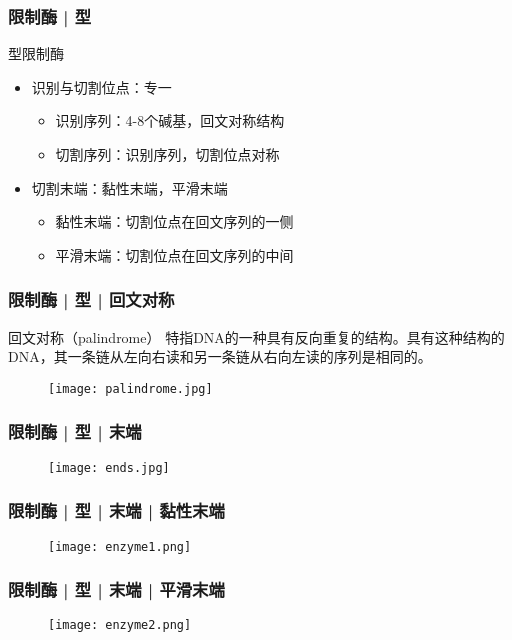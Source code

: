 \begin{frame}
  \frametitle{限制酶 | \alert{型}}
  \begin{block}{型限制酶}
  \begin{itemize}
    \item 识别与切割位点：专一
      \begin{itemize}
        \item 识别序列：4-8个碱基，回文对称结构
        \item 切割序列：识别序列，切割位点对称
      \end{itemize}
    \item 切割末端：黏性末端，平滑末端
      \begin{itemize}
        \item 黏性末端：切割位点在回文序列的一侧
        \item 平滑末端：切割位点在回文序列的中间
      \end{itemize}
  \end{itemize}
  \end{block}
\end{frame}

\begin{frame}
  \frametitle{限制酶 | 型 | 回文对称}
  \begin{block}{回文对称（palindrome）}
    特指DNA的一种具有反向重复的结构。具有这种结构的DNA，其一条链从左向右读和另一条链从右向左读的序列是相同的。
  \end{block}
  \begin{figure}
    \centering
    \texttt{[image: palindrome.jpg]}
  \end{figure}
\end{frame}

\begin{frame}
  \frametitle{限制酶 | 型 | 末端}
  \begin{figure}
    \centering
    \texttt{[image: ends.jpg]}
  \end{figure}
\end{frame}

\begin{frame}
  \frametitle{限制酶 | 型 | 末端 | 黏性末端}
  \begin{figure}
    \centering
    \texttt{[image: enzyme1.png]}
  \end{figure}
\end{frame}

\begin{frame}
  \frametitle{限制酶 | 型 | 末端 | 平滑末端}
  \begin{figure}
    \centering
    \texttt{[image: enzyme2.png]}
  \end{figure}
\end{frame}

